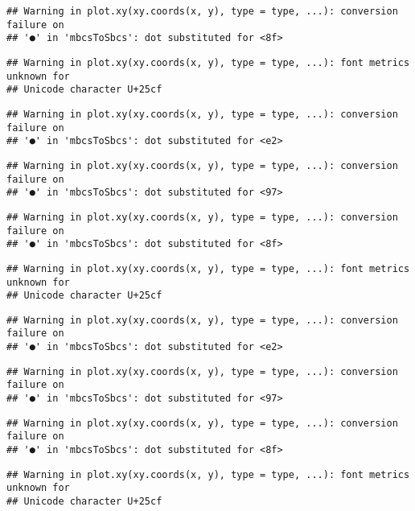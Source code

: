 \documentclass[
]{article}
\begin{document}
\begin{verbatim}
## Warning in plot.xy(xy.coords(x, y), type = type, ...): conversion failure on
## '●' in 'mbcsToSbcs': dot substituted for <8f>
\end{verbatim}

\begin{verbatim}
## Warning in plot.xy(xy.coords(x, y), type = type, ...): font metrics unknown for
## Unicode character U+25cf
\end{verbatim}

\begin{verbatim}
## Warning in plot.xy(xy.coords(x, y), type = type, ...): conversion failure on
## '●' in 'mbcsToSbcs': dot substituted for <e2>
\end{verbatim}

\begin{verbatim}
## Warning in plot.xy(xy.coords(x, y), type = type, ...): conversion failure on
## '●' in 'mbcsToSbcs': dot substituted for <97>
\end{verbatim}

\begin{verbatim}
## Warning in plot.xy(xy.coords(x, y), type = type, ...): conversion failure on
## '●' in 'mbcsToSbcs': dot substituted for <8f>
\end{verbatim}

\begin{verbatim}
## Warning in plot.xy(xy.coords(x, y), type = type, ...): font metrics unknown for
## Unicode character U+25cf
\end{verbatim}

\begin{verbatim}
## Warning in plot.xy(xy.coords(x, y), type = type, ...): conversion failure on
## '●' in 'mbcsToSbcs': dot substituted for <e2>
\end{verbatim}

\begin{verbatim}
## Warning in plot.xy(xy.coords(x, y), type = type, ...): conversion failure on
## '●' in 'mbcsToSbcs': dot substituted for <97>
\end{verbatim}

\begin{verbatim}
## Warning in plot.xy(xy.coords(x, y), type = type, ...): conversion failure on
## '●' in 'mbcsToSbcs': dot substituted for <8f>
\end{verbatim}

\begin{verbatim}
## Warning in plot.xy(xy.coords(x, y), type = type, ...): font metrics unknown for
## Unicode character U+25cf
\end{verbatim}
\end{document}
